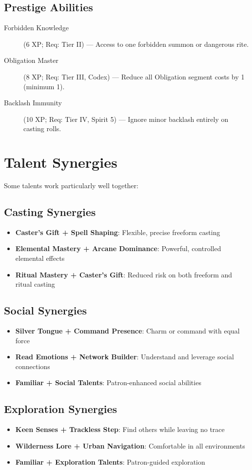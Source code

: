 \subsection*{Prestige Abilities}
\begin{description}
\item[Forbidden Knowledge] (6 XP; Req: Tier II) --- Access to one forbidden summon or dangerous rite.
\item[Obligation Master] (8 XP; Req: Tier III, Codex) --- Reduce all Obligation segment costs by 1 (minimum 1).
\item[Backlash Immunity] (10 XP; Req: Tier IV, Spirit 5) --- Ignore minor backlash entirely on casting rolls.
\end{description}

\section{Talent Synergies}

Some talents work particularly well together:

\subsection*{Casting Synergies}
\begin{itemize}
\item \textbf{Caster's Gift + Spell Shaping}: Flexible, precise freeform casting
\item \textbf{Elemental Mastery + Arcane Dominance}: Powerful, controlled elemental effects
\item \textbf{Ritual Mastery + Caster's Gift}: Reduced risk on both freeform and ritual casting
\end{itemize}

\subsection*{Social Synergies}
\begin{itemize}
\item \textbf{Silver Tongue + Command Presence}: Charm or command with equal force
\item \textbf{Read Emotions + Network Builder}: Understand and leverage social connections
\item \textbf{Familiar + Social Talents}: Patron-enhanced social abilities
\end{itemize}

\subsection*{Exploration Synergies}
\begin{itemize}
\item \textbf{Keen Senses + Trackless Step}: Find others while leaving no trace
\item \textbf{Wilderness Lore + Urban Navigation}: Comfortable in all environments
\item \textbf{Familiar + Exploration Talents}: Patron-guided exploration
\end{itemize}

